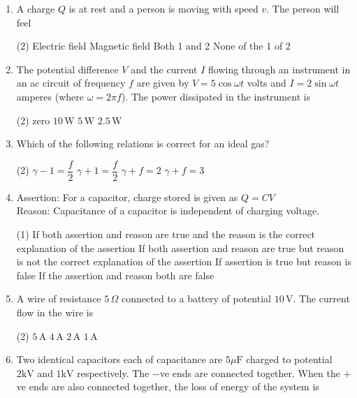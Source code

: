 \documentclass[twocolumn]{article}
\renewcommand{\frac}[2]{\dfrac{#1}{#2}}
\begin{document}
\begin{enumerate}
    \item A charge \( Q \) is at rest and a person is moving with speed \( v \). The person will feel
    \begin{tasks}(2)
        \task Electric field
        \task Magnetic field
        \task Both 1 and 2
        \task None of the 1 of 2
    \end{tasks}
    \item The potential difference \( V \) and the current \( I \) flowing through an instrument in an ac circuit of frequency \( f \) are given by \( V = 5 \cos \omega t \) volts and \( I = 2 \sin \omega t \) amperes (where \( \omega = 2\pi f \)). The power dissipated in the instrument is
    \begin{tasks}(2)
        \task zero
        \task \(10 \, \text{W}\)
        \task \(5 \, \text{W}\)
        \task \(2.5 \, \text{W}\)
    \end{tasks}
    \item Which of the following relations is correct for an ideal gas?
    \begin{tasks}(2)
        \task \( \gamma - 1 = \frac{f}{2} \)
        \task \( \gamma + 1 = \frac{f}{2} \)
        \task \( \gamma + f = 2 \)
        \task \( \gamma + f = 3 \)
    \end{tasks}
    \item Assertion: For a capacitor, charge stored is given as \( Q = CV \) \\
    Reason: Capacitance of a capacitor is independent of charging voltage.
    \begin{tasks}(1)
        \task If both assertion and reason are true and the reason is the correct explanation of the assertion
        \task If both assertion and reason are true but reason is not the correct explanation of the assertion
        \task If assertion is true but reason is false
        \task If the assertion and reason both are false
    \end{tasks}
    \item A wire of resistance \( 5 \, \Omega \) connected to a battery of potential \( 10 \, \text{V} \). The current flow in the wire is
    \begin{tasks}(2)
        \task \(5 \, \text{A}\)
        \task \(4 \, \text{A}\)
        \task \(2 \, \text{A}\)
        \task \(1 \, \text{A}\)
    \end{tasks}
    \item Two identical capacitors each of capacitance are \( 5\mu \text{F} \) charged to potential \( 2 \text{kV} \) and \( 1 \text{kV} \) respectively. The \(-\)ve ends are connected together. When the \(+\)ve ends are also connected together, the loss of energy of the system is

\end{enumerate}
\end{document}
